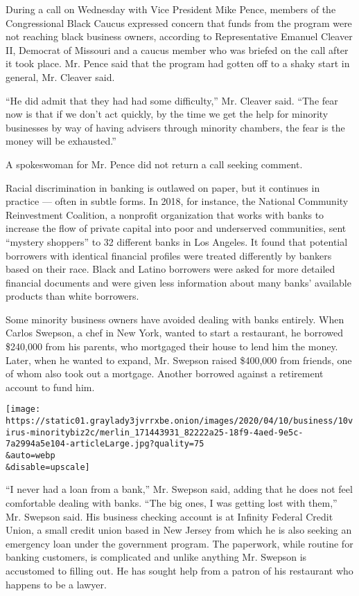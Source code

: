 During a call on Wednesday with Vice President Mike Pence, members of
the Congressional Black Caucus expressed concern that funds from the
program were not reaching black business owners, according to
Representative Emanuel Cleaver II, Democrat of Missouri and a caucus
member who was briefed on the call after it took place. Mr. Pence said
that the program had gotten off to a shaky start in general, Mr. Cleaver
said.

``He did admit that they had had some difficulty,'' Mr. Cleaver said.
``The fear now is that if we don't act quickly, by the time we get the
help for minority businesses by way of having advisers through minority
chambers, the fear is the money will be exhausted.''

A spokeswoman for Mr. Pence did not return a call seeking comment.

Racial discrimination in banking is outlawed on paper, but it continues
in practice --- often in subtle forms. In 2018, for instance, the
National Community Reinvestment Coalition, a nonprofit organization that
works with banks to increase the flow of private capital into poor and
underserved communities, sent ``mystery shoppers'' to 32 different banks
in Los Angeles. It found that potential borrowers with identical
financial profiles were treated differently by bankers based on their
race. Black and Latino borrowers were asked for more detailed financial
documents and were given less information about many banks' available
products than white borrowers.

Some minority business owners have avoided dealing with banks entirely.
When Carlos Swepson, a chef in New York, wanted to start a restaurant,
he borrowed \$240,000 from his parents, who mortgaged their house to
lend him the money. Later, when he wanted to expand, Mr. Swepson raised
\$400,000 from friends, one of whom also took out a mortgage. Another
borrowed against a retirement account to fund him.

\texttt{[image: https://static01.graylady3jvrrxbe.onion/images/2020/04/10/business/10virus-minoritybiz2c/merlin\_171443931\_82222a25-18f9-4aed-9e5c-7a2994a5e104-articleLarge.jpg?quality=75\\\&auto=webp\\\&disable=upscale]}

``I never had a loan from a bank,'' Mr. Swepson said, adding that he
does not feel comfortable dealing with banks. ``The big ones, I was
getting lost with them,'' Mr. Swepson said. His business checking
account is at Infinity Federal Credit Union, a small credit union based
in New Jersey from which he is also seeking an emergency loan under the
government program. The paperwork, while routine for banking customers,
is complicated and unlike anything Mr. Swepson is accustomed to filling
out. He has sought help from a patron of his restaurant who happens to
be a lawyer.

